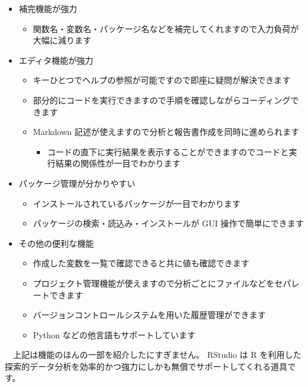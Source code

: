 \documentclass[
  12pt,
]{book}
\providecommand{\tightlist}{%
  \setlength{\itemsep}{0pt}\setlength{\parskip}{0pt}}
\begin{document}
\begin{itemize}
\tightlist
\item
  補完機能が強力

  \begin{itemize}
  \tightlist
  \item
    関数名・変数名・パッケージ名などを補完してくれますので入力負荷が大幅に減ります
  \end{itemize}
\item
  エディタ機能が強力

  \begin{itemize}
  \tightlist
  \item
    キーひとつでヘルプの参照が可能ですので即座に疑問が解決できます
  \item
    部分的にコードを実行できますので手順を確認しながらコーディングできます
  \item
    Markdown 記述が使えますので分析と報告書作成を同時に進められます

    \begin{itemize}
    \tightlist
    \item
      コードの直下に実行結果を表示することができますのでコードと実行結果の関係性が一目でわかります
    \end{itemize}
  \end{itemize}
\item
  パッケージ管理が分かりやすい

  \begin{itemize}
  \tightlist
  \item
    インストールされているパッケージが一目でわかります
  \item
    パッケージの検索・読込み・インストールが GUI 操作で簡単にできます
  \end{itemize}
\item
  その他の便利な機能

  \begin{itemize}
  \tightlist
  \item
    作成した変数を一覧で確認できると共に値も確認できます
  \item
    プロジェクト管理機能が使えますので分析ごとにファイルなどをセパレートできます
  \item
    バージョンコントロールシステムを用いた履歴管理ができます
  \item
    Python などの他言語もサポートしています
  \end{itemize}
\end{itemize}

　上記は機能のほんの一部を紹介したにすぎません。 RStudio は R を利用した探索的データ分析を効率的かつ強力にしかも無償でサポートしてくれる道具です。\\
　
\end{document}
